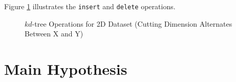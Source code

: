 Figure \ref{fig:kd-tree} illustrates the \texttt{insert} and \texttt{delete} operations.

\begin{figure}
	\begin{center}
	\end{center}

	\caption{$kd$-tree Operations for 2D Dataset (Cutting Dimension Alternates Between X and Y)}
	\label{fig:kd-tree}
\end{figure}

\section{Main Hypothesis}
\label{sec:main-hypothesis}

